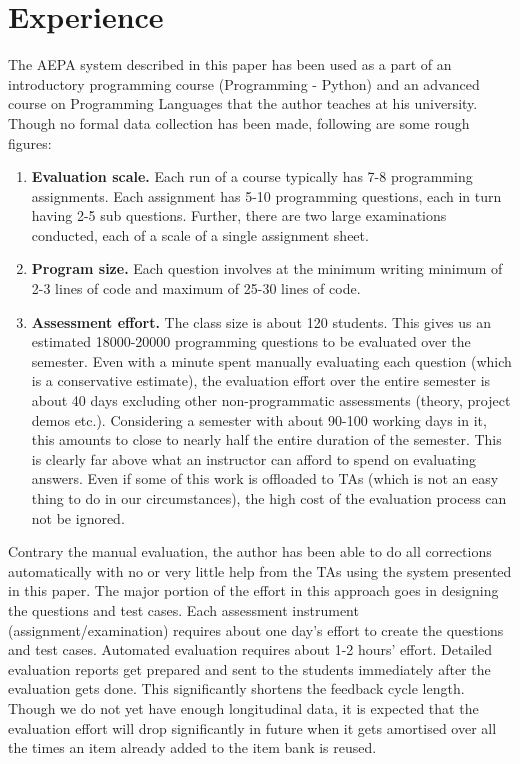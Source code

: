 \documentclass[12pt]{article}
\begin{document}
\section{Experience}
The AEPA system described in this paper has been used as a part of an introductory programming course (Programming - Python) and an advanced course on Programming Languages that the author teaches at his university. Though no formal data collection has been made, following are some rough figures:
\begin{enumerate}
\item \textbf{Evaluation scale.} Each run of a course typically has 7-8 programming assignments. Each assignment has 5-10 programming questions, each in turn having 2-5 sub questions. Further, there are two large examinations conducted, each of a scale of a single assignment sheet.
\item \textbf{Program size.} Each question involves at the minimum writing minimum of 2-3 lines of code and maximum of 25-30 lines of code.
\item \textbf{Assessment effort.} The class size is about 120 students. This gives us an estimated 18000-20000 programming questions to be evaluated over the semester. Even with a minute spent manually evaluating each question (which is a conservative estimate), the evaluation effort over the entire semester is about 40 days excluding other non-programmatic assessments (theory, project demos etc.). Considering a semester with about 90-100 working days in it, this amounts to close to nearly half the entire duration of the semester. This is clearly far above what an instructor can afford to spend on evaluating answers. Even if some of this work is offloaded to TAs (which is not an easy thing to do in our circumstances), the high cost of the evaluation process can not be ignored.
\end{enumerate}

Contrary the manual evaluation, the author has been able to do all corrections automatically with no or very little help from the TAs using the system presented in this paper. The major portion of the effort in this approach goes in designing the questions and test cases. Each assessment instrument (assignment/examination) requires about one day's effort to create the questions and test cases. Automated evaluation requires about 1-2 hours' effort. Detailed evaluation reports get prepared and sent to the students immediately after the evaluation gets done. This significantly shortens the feedback cycle length. Though we do not yet have enough longitudinal data, it is expected that the evaluation effort will drop significantly in future when it gets amortised over all the times an item already added to the item bank is reused.
\end{document}
